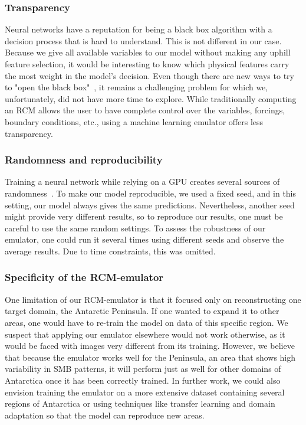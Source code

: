 \documentclass[a4paper,11pt,oneside]{report}
\begin{document}
\subsubsection{Transparency}
Neural networks have a reputation for being a black box algorithm with a decision process that is hard to understand. This is not different in our case. Because we give all available variables to our model without making any uphill feature selection, it would be interesting to know which physical features carry the most weight in the model's decision. Even though there are new ways to try to "open the black box"~\cite{Guidotti, Shwartz2017}, it remains a challenging problem for which we, unfortunately, did not have more time to explore. While traditionally computing an RCM allows the user to have complete control over the variables, forcings, boundary conditions, etc., using a machine learning emulator offers less transparency.

\subsubsection{Randomness and reproducibility}
Training a neural network while relying on a GPU creates several sources of randomness~\cite{Zhuang2021, Reproducibility}. To make our model reproducible, we used a fixed seed, and in this setting, our model always gives the same predictions. Nevertheless, another seed might provide very different results, so to reproduce our results, one must be careful to use the same random settings. To assess the robustness of our emulator, one could run it several times using different seeds and observe the average results. Due to time constraints, this was omitted. 

\subsubsection{Specificity of the RCM-emulator}
One limitation of our RCM-emulator is that it focused only on reconstructing one target domain, the Antarctic Peninsula. If one wanted to expand it to other areas, one would have to re-train the model on data of this specific region. We suspect that applying our emulator elsewhere would not work otherwise, as it would be faced with images very different from its training. However, we believe that because the emulator works well for the Peninsula, an area that shows high variability in SMB patterns, it will perform just as well for other domains of Antarctica once it has been correctly trained. In further work, we could also envision training the emulator on a more extensive dataset containing several regions of Antarctica or using techniques like transfer learning and domain adaptation so that the model can reproduce new areas.  
\end{document}
